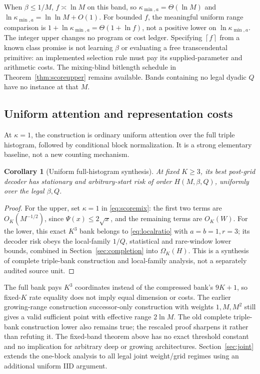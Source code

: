 \documentclass[11pt,letterpaper]{article}
\newtheorem{corollary}[theorem]{Corollary}
\theoremstyle{definition}\newtheorem{definition}[theorem]{Definition}
\theoremstyle{remark}\newtheorem{remark}[theorem]{Remark}
\newcommand{\ceil}[1]{\left\lceil #1\right\rceil}
\begin{document}
When $\beta\le1/M$, $f\asymp\ln M$ on this band, so $\kappa_{\min,a}=\Theta(\ln M)$ and $\ln\kappa_{\min,a}=\ln\ln M+O(1)$. For bounded $f$, the meaningful uniform range comparison is $1+\ln\kappa_{\min,a}=\Theta(1+\ln f)$, not a positive lower on $\ln\kappa_{\min,a}$. The integer upper changes no program or cost ledger. Specifying $\ceil f$ from a known class promise is not learning $\beta$ or evaluating a free transcendental primitive: an implemented selection rule must pay its supplied-parameter and arithmetic costs. The mixing-blind bitlength schedule in Theorem~\ref{thm:scoreupper} remains available. Bands containing no legal dyadic $Q$ have no instance at that $M$.

\subsection{Uniform attention and representation costs}
At $\kappa=1$, the construction is ordinary uniform attention over the full triple histogram, followed by conditional block normalization. It is a strong elementary baseline, not a new counting mechanism.
\begin{corollary}[Uniform full-histogram synthesis]\label{cor:hist}
At fixed $K\ge3$, its best post-grid decoder has stationary and arbitrary-start risk of order $H(M,\beta,Q)$, uniformly over the legal $\beta,Q$.
\end{corollary}
\begin{proof}
For the upper, set $\kappa=1$ in \eqref{eq:scoremix}: the first two terms are $O_K(M^{-1/2})$, since $\Psi(x)\le2\sqrt x$, and the remaining terms are $O_K(W)$. For the lower, this exact $K^3$ bank belongs to \eqref{eq:localratio} with $a=b=1,r=3$; its decoder risk obeys the local-family $1/Q$, statistical and rare-window lower bounds, combined in Section~\ref{sec:completion} into $\Omega_K(H)$. This is a synthesis of complete triple-bank construction and local-family analysis, not a separately audited source unit.
\end{proof}

The full bank pays $K^3$ coordinates instead of the compressed bank's $9K+1$, so fixed-$K$ rate equality does not imply equal dimension or costs. The earlier growing-range construction successor-only construction with weights $1,M,M^2$ still gives a valid sufficient point with effective range $2\ln M$. The old complete triple-bank construction lower also remains true; the rescaled proof sharpens it rather than refuting it. The fixed-band theorem above has no exact threshold constant and no implication for arbitrary deep or growing architectures. Section~\ref{sec:joint} extends the one-block analysis to all legal joint weight/grid regimes using an additional uniform IID argument.
\end{document}
